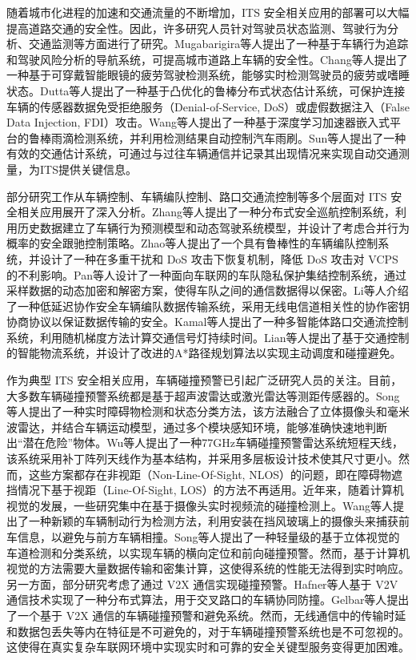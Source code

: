 随着城市化进程的加速和交通流量的不断增加，ITS 安全相关应用的部署可以大幅提高道路交通的安全性。因此，许多研究人员针对驾驶员状态监测、驾驶行为分析、交通监测等方面进行了研究。Mugabarigira等人\cite{mugabarigira2023context}提出了一种基于车辆行为追踪和驾驶风险分析的导航系统，可提高城市道路上车辆的安全性。Chang等人\cite{chang2018design}提出了一种基于可穿戴智能眼镜的疲劳驾驶检测系统，能够实时检测驾驶员的疲劳或嗜睡状态。Dutta等人\cite{dutta2022design}提出了一种基于凸优化的鲁棒分布式状态估计系统，可保护连接车辆的传感器数据免受拒绝服务（Denial-of-Service, DoS）或虚假数据注入（False Data Injection, FDI）攻击。Wang等人\cite{wang2021deep}提出了一种基于深度学习加速器嵌入式平台的鲁棒雨滴检测系统，并利用检测结果自动控制汽车雨刷。Sun等人\cite{sun2022toward}提出了一种有效的交通估计系统，可通过与过往车辆通信并记录其出现情况来实现自动交通测量，为ITS提供关键信息。

部分研究工作从车辆控制、车辆编队控制、路口交通流控制等多个层面对 ITS 安全相关应用展开了深入分析。Zhang等人\cite{zhang2021data}提出了一种分布式安全巡航控制系统，利用历史数据建立了车辆行为预测模型和动态驾驶系统模型，并设计了考虑合并行为概率的安全跟驰控制策略。Zhao等人\cite{zhao2022resilient}提出了一个具有鲁棒性的车辆编队控制系统，并设计了一种在多重干扰和 DoS 攻击下恢复机制，降低 DoS 攻击对 VCPS 的不利影响。Pan等人\cite{pan2023privacy}设计了一种面向车联网的车队隐私保护集结控制系统，通过采样数据的动态加密和解密方案，使得车队之间的通信数据得以保密。Li等人\cite{li2021confidenitality}介绍了一种低延迟协作安全车辆编队数据传输系统，采用无线电信道相关性的协作密钥协商协议以保证数据传输的安全。Kamal等人\cite{kamal2021control}提出了一种多智能体路口交通流控制系统，利用随机梯度方法计算交通信号灯持续时间。Lian等人\cite{lian2021cyber}提出了基于交通控制的智能物流系统，并设计了改进的A*路径规划算法以实现主动调度和碰撞避免。

作为典型 ITS 安全相关应用，车辆碰撞预警已引起广泛研究人员的关注。目前，大多数车辆碰撞预警系统都是基于超声波雷达或激光雷达等测距传感器的。Song等人\cite{song2018real}提出了一种实时障碍物检测和状态分类方法，该方法融合了立体摄像头和毫米波雷达，并结合车辆运动模型，通过多个模块感知环境，能够准确快速地判断出“潜在危险”物体。Wu等人\cite{wu2019series}提出了一种77GHz车辆碰撞预警雷达系统短程天线，该系统采用补丁阵列天线作为基本结构，并采用多层板设计技术使其尺寸更小。然而，这些方案都存在非视距（Non-Line-Of-Sight, NLOS）的问题，即在障碍物遮挡情况下基于视距（Line-Of-Sight, LOS）的方法不再适用。近年来，随着计算机视觉的发展，一些研究集中在基于摄像头实时视频流的碰撞检测上。Wang等人\cite{wang2016vision}提出了一种新颖的车辆制动行为检测方法，利用安装在挡风玻璃上的摄像头来捕获前车信息，以避免与前方车辆相撞。Song等人\cite{song2018lane}提出了一种轻量级的基于立体视觉的车道检测和分类系统，以实现车辆的横向定位和前向碰撞预警。然而，基于计算机视觉的方法需要大量数据传输和密集计算，这使得系统的性能无法得到实时响应。另一方面，部分研究考虑了通过 V2X 通信实现碰撞预警。Hafner等人\cite{hafner2013cooperative}基于 V2V 通信技术实现了一种分布式算法，用于交叉路口的车辆协同防撞。Gelbar等人\cite{gelbal2017elastic}提出了一个基于 V2X 通信的车辆碰撞预警和避免系统。然而，无线通信中的传输时延和数据包丢失等内在特征是不可避免的，对于车辆碰撞预警系统也是不可忽视的。这使得在真实复杂车联网环境中实现实时和可靠的安全关键型服务变得更加困难。

